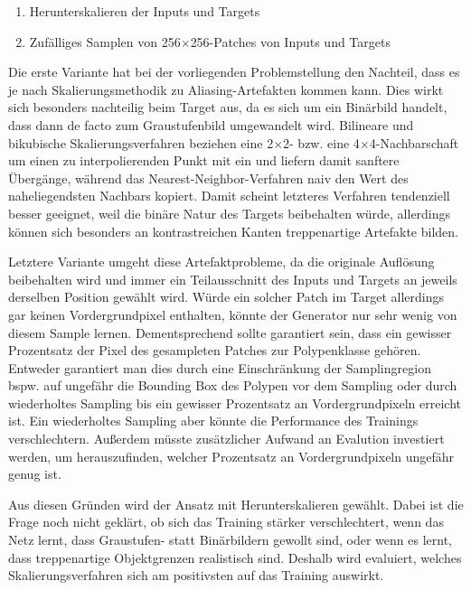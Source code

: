 \begin{enumerate}
	\item Herunterskalieren der Inputs und Targets
	\item Zufälliges Samplen von 256$\times$256-Patches von Inputs und Targets
\end{enumerate}

Die erste Variante hat bei der vorliegenden Problemstellung den Nachteil, dass es je nach Skalierungsmethodik zu Aliasing-Artefakten kommen kann.
Dies wirkt sich besonders nachteilig beim Target aus, da es sich um ein Binärbild handelt, dass dann de facto zum Graustufenbild umgewandelt wird.
Bilineare und bikubische Skalierungsverfahren beziehen eine 2$\times$2- bzw. eine 4$\times$4-Nachbarschaft um einen zu interpolierenden Punkt mit ein und liefern damit sanftere Übergänge, während das Nearest-Neighbor-Verfahren naiv den Wert des naheliegendsten Nachbars kopiert.
Damit scheint letzteres Verfahren tendenziell besser geeignet, weil die binäre Natur des Targets beibehalten würde, allerdings können sich besonders an kontrastreichen Kanten treppenartige Artefakte bilden.

Letztere Variante umgeht diese Artefaktprobleme, da die originale Auflösung beibehalten wird und immer ein Teilausschnitt des Inputs und Targets an jeweils derselben Position gewählt wird.
Würde ein solcher Patch im Target allerdings gar keinen Vordergrundpixel enthalten, könnte der Generator nur sehr wenig von diesem Sample lernen.
Dementsprechend sollte garantiert sein, dass ein gewisser Prozentsatz der Pixel des gesampleten Patches zur Polypenklasse gehören.
Entweder garantiert man dies durch eine Einschränkung der Samplingregion bspw. auf ungefähr die Bounding Box des Polypen vor dem Sampling oder durch wiederholtes Sampling bis ein gewisser Prozentsatz an Vordergrundpixeln erreicht ist.
Ein wiederholtes Sampling aber könnte die Performance des Trainings verschlechtern.
Außerdem müsste zusätzlicher Aufwand an Evalution investiert werden, um herauszufinden, welcher Prozentsatz an Vordergrundpixeln ungefähr genug ist.

Aus diesen Gründen wird der Ansatz mit Herunterskalieren gewählt.
Dabei ist die Frage noch nicht geklärt, ob sich das Training stärker verschlechtert, wenn das Netz lernt, dass Graustufen- statt Binärbildern gewollt sind, oder wenn es lernt, dass treppenartige Objektgrenzen realistisch sind.
Deshalb wird evaluiert, welches Skalierungsverfahren sich am positivsten auf das Training auswirkt.



